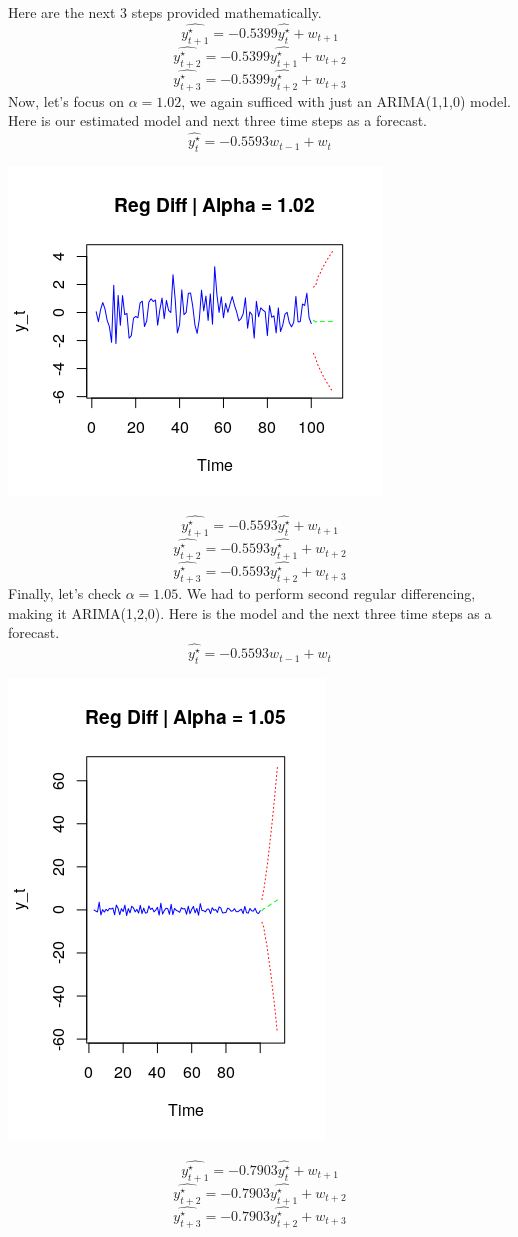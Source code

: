 \documentclass[11pt]{article}
\begin{document}
Here are the next 3 steps provided mathematically.
$$ \hat{y_{t+1}^\star} = -0.5399\hat{y_t^\star} + w_{t+1} $$
$$ \hat{y_{t+2}^\star} = -0.5399\hat{y_{t+1}^\star} + w_{t+2} $$
$$ \hat{y_{t+3}^\star} = -0.5399\hat{y_{t+2}^\star} + w_{t+3} $$
Now, let's focus on $\alpha = 1.02$, we again sufficed with just an ARIMA(1,1,0) model. Here is our estimated model and next three time steps as a forecast.
$$ \hat{y_t^\star} = -0.5593w_{t-1} + w_t $$
\begin{center}
\includegraphics[scale=1]{1c5}
\end{center}
$$ \hat{y_{t+1}^\star} = -0.5593\hat{y_{t}^\star} + w_{t+1} $$
$$ \hat{y_{t+2}^\star} = -0.5593\hat{y_{t+1}^\star} + w_{t+2} $$
$$ \hat{y_{t+3}^\star} = -0.5593\hat{y_{t+2}^\star} + w_{t+3} $$
Finally, let's check $\alpha = 1.05$. We had to perform second regular differencing, making it ARIMA(1,2,0). Here is the model and the next three time steps as a forecast.
$$ \hat{y_t^\star} = -0.5593w_{t-1} + w_t $$
\begin{center}
\includegraphics[scale=1]{1c6}
\end{center}
$$ \hat{y_{t+1}^\star} = -0.7903\hat{y_{t}^\star} + w_{t+1} $$
$$ \hat{y_{t+2}^\star} = -0.7903\hat{y_{t+1}^\star} + w_{t+2} $$
$$ \hat{y_{t+3}^\star} = -0.7903\hat{y_{t+2}^\star} + w_{t+3} $$
\end{document}

